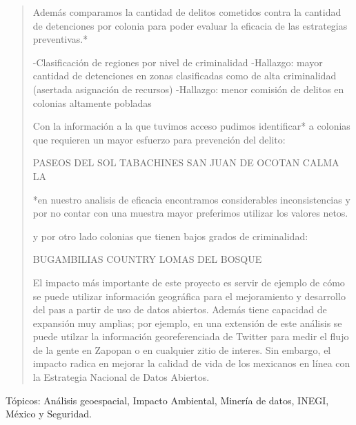 \begin{quotation}
Además comparamos la cantidad de delitos cometidos contra la cantidad de detenciones por colonia para poder evaluar la eficacia de las estrategias preventivas.*


-Clasificación de regiones por nivel de criminalidad
-Hallazgo: mayor cantidad de detenciones en zonas clasificadas como de alta criminalidad (asertada asignación de recursos)
-Hallazgo: menor comisión de delitos en colonias altamente pobladas

Con la información a la que tuvimos acceso pudimos identificar* a colonias que requieren un mayor esfuerzo para prevención del delito:

PASEOS DEL SOL
TABACHINES
SAN JUAN DE OCOTAN
CALMA LA

*en nuestro analisis de eficacia encontramos considerables inconsistencias y por no contar con una muestra mayor preferimos utilizar los valores netos.

y por otro lado colonias que tienen bajos grados de criminalidad:

BUGAMBILIAS COUNTRY
LOMAS DEL BOSQUE


El impacto más importante de este proyecto es servir de ejemplo de cómo se puede utilizar  información geográfica  para el mejoramiento y desarrollo del paıs a partir de uso de datos abiertos. Además tiene capacidad  de expansión muy amplias; por ejemplo, en una extensión de este análisis se puede utilzar la información georeferenciada de Twitter para medir el flujo de la gente en Zapopan o en cualquier zitio de interes. Sin embargo, el impacto radica en mejorar la calidad de vida de los mexicanos en línea con la Estrategia Nacional de Datos Abiertos.
                                                   
                        




\end{quotation}

\vfill
Tópicos: Análisis geoespacial,  Impacto Ambiental, Minería de datos, INEGI, México y Seguridad.

